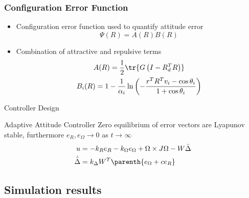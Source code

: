 \documentclass[11pt,professionalfonts]{beamer}
\begin{document}
\begin{frame}%
\frametitle{Configuration Error Function}
\begin{itemize}
	\item Configuration error function used to quantify attitude error
        \[
        	\Psi(R) = A(R) B(R) 
        \]
	\item Combination of attractive and repulsive terms   
        \begin{gather*}
        	A(R) = \frac{1}{2} \tr{G \left( I - R_d^T R\right)} \\
        	B_i(R) = 1 - \frac{1}{\alpha_i} \ln \left( - \frac{ r^T R^T v_i - \cos \theta_i}{1 + \cos \theta_i}\right)
        \end{gather*}
\end{itemize}
\end{frame} %

\begin{frame}{Controller Design} %
	\begin{block}{Adaptive Attitude Controller}
		Zero equilibrium of error vectors are Lyapunov stable, furthermore \( e_R , e_\Omega \to 0 \) as \( t \to \infty \)
		\begin{align*}
			u &= - k_R e_R - k_{\Omega} e_{\Omega} + \Omega \times J \Omega - W \bar{\Delta} \\
			\dot{\bar{\Delta}} &= k_\Delta W^T \parenth{ e_\Omega + c e_R }
		\end{align*}
	\end{block}
\end{frame}%

\subsection{Simulation results}
\end{document}
